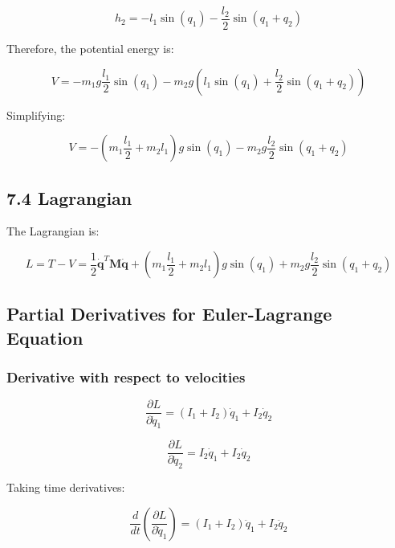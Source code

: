 \begin{equation}
h_2 = -l_1 \sin(q_1) - \frac{l_2}{2} \sin(q_1 + q_2)
\end{equation}

Therefore, the potential energy is:

\begin{equation}
V = -m_1 g \frac{l_1}{2} \sin(q_1) - m_2 g \left(l_1 \sin(q_1) + \frac{l_2}{2} \sin(q_1 + q_2)\right)
\end{equation}

Simplifying:

\begin{equation}
V = -\left(m_1 \frac{l_1}{2} + m_2 l_1\right) g \sin(q_1) - m_2 g \frac{l_2}{2} \sin(q_1 + q_2)
\end{equation}

\subsection{7.4 Lagrangian}

The Lagrangian is:

\begin{equation}
L = T - V = \frac{1}{2} \dot{\mathbf{q}}^T \mathbf{M} \dot{\mathbf{q}} + \left(m_1 \frac{l_1}{2} + m_2 l_1\right) g \sin(q_1) + m_2 g \frac{l_2}{2} \sin(q_1 + q_2)
\end{equation}

\subsection{Partial Derivatives for Euler-Lagrange Equation}

\subsubsection{Derivative with respect to velocities}

\begin{equation}
\frac{\partial L}{\partial \dot{q}_1} = (I_1 + I_2) \dot{q}_1 + I_2 \dot{q}_2
\end{equation}

\begin{equation}
\frac{\partial L}{\partial \dot{q}_2} = I_2 \dot{q}_1 + I_2 \dot{q}_2
\end{equation}

Taking time derivatives:

\begin{equation}
\frac{d}{dt}\left(\frac{\partial L}{\partial \dot{q}_1}\right) = (I_1 + I_2) \ddot{q}_1 + I_2 \ddot{q}_2
\end{equation}

